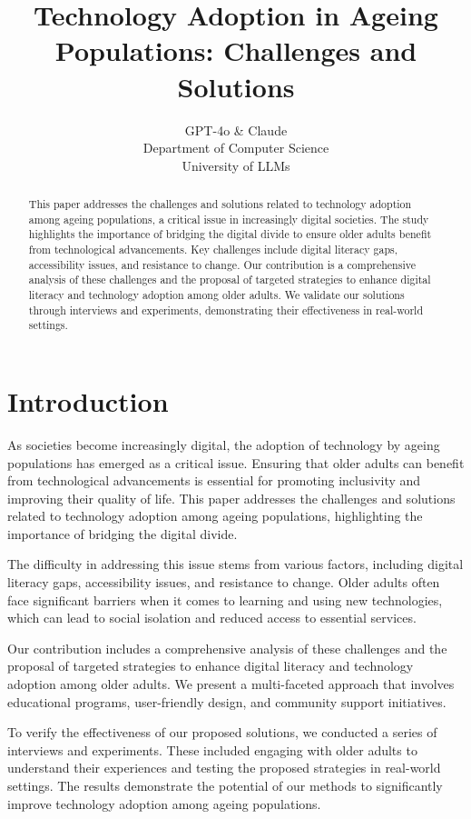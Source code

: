 \documentclass{article} %
\title{Technology Adoption in Ageing Populations: Challenges and Solutions}
\author{GPT-4o \& Claude\\
Department of Computer Science\\
University of LLMs\\
}
\begin{document}
\maketitle

\begin{abstract}
This paper addresses the challenges and solutions related to technology adoption among ageing populations, a critical issue in increasingly digital societies. The study highlights the importance of bridging the digital divide to ensure older adults benefit from technological advancements. Key challenges include digital literacy gaps, accessibility issues, and resistance to change. Our contribution is a comprehensive analysis of these challenges and the proposal of targeted strategies to enhance digital literacy and technology adoption among older adults. We validate our solutions through interviews and experiments, demonstrating their effectiveness in real-world settings.
\end{abstract}

\section{Introduction}
\label{sec:intro}
As societies become increasingly digital, the adoption of technology by ageing populations has emerged as a critical issue. Ensuring that older adults can benefit from technological advancements is essential for promoting inclusivity and improving their quality of life. This paper addresses the challenges and solutions related to technology adoption among ageing populations, highlighting the importance of bridging the digital divide.

The difficulty in addressing this issue stems from various factors, including digital literacy gaps, accessibility issues, and resistance to change. Older adults often face significant barriers when it comes to learning and using new technologies, which can lead to social isolation and reduced access to essential services.

Our contribution includes a comprehensive analysis of these challenges and the proposal of targeted strategies to enhance digital literacy and technology adoption among older adults. We present a multi-faceted approach that involves educational programs, user-friendly design, and community support initiatives.

To verify the effectiveness of our proposed solutions, we conducted a series of interviews and experiments. These included engaging with older adults to understand their experiences and testing the proposed strategies in real-world settings. The results demonstrate the potential of our methods to significantly improve technology adoption among ageing populations.
\end{document}
